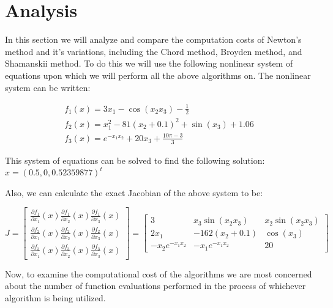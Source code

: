 \documentclass[paper=a4, fontsize=11pt]{scrartcl} %
\numberwithin{equation}{section} %
\numberwithin{figure}{section} %
\numberwithin{table}{section} %
\begin{document}
\section{Analysis}

In this section we will analyze and compare the computation costs of Newton's method and it's variations, including the Chord method, Broyden method, and Shamanskii method.  To do this we will use the following nonlinear system of equations upon which we will perform all the above algorithms on.  The nonlinear system can be written:

\begin{exmp}
$$
\begin{array}{lll}
f_1(x) = 3x_1 - \cos(x_2x_3) - \frac{1}{2} \\
f_2(x) = x_1^2 - 81(x_2 + 0.1)^2 + \sin(x_3) + 1.06 \\
f_3(x) = e^{-x_1x_2} + 20x_3 + \frac{10 \pi - 3}{3} 
\end{array}
$$

This system of equations can be solved to find the following solution:
$x = (0.5,0,0.52359877)^t$

Also, we can calculate the exact Jacobian of the above system to be:

$$
J =
\begin{bmatrix}
\frac{\partial{f_1}}{\partial{x_1}}(x) \frac{\partial{f_1}}{\partial{x_2}}(x) \frac{\partial{f_1}}{\partial{x_3}}(x) \\
\frac{\partial{f_2}}{\partial{x_1}}(x) \frac{\partial{f_2}}{\partial{x_2}}(x) \frac{\partial{f_2}}{\partial{x_3}}(x) \\
\frac{\partial{f_3}}{\partial{x_1}}(x) \frac{\partial{f_3}}{\partial{x_2}}(x) \frac{\partial{f_3}}{\partial{x_3}}(x)
\end{bmatrix} =
\begin{bmatrix}
3 & x_3 \sin(x_2x_3) & x_2 \sin(x_2x_3) \\
2x_1 & -162(x_2+0.1) & \cos(x_3) \\
-x_2 e^{-x_1x_2} & -x_1 e^{-x_1x_2} & 20 
\end{bmatrix}
$$
\end{exmp}

Now, to examine the computational cost of the algorithms we are most concerned about the number of function evaluations performed in the process of whichever algorithm is being utilized.  

\bigskip
\end{document}
